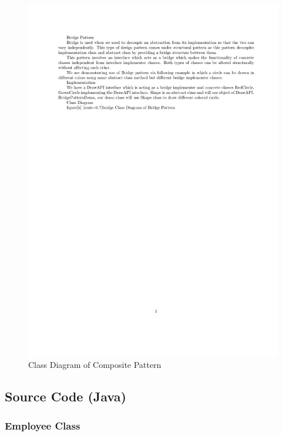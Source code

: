\begin{figure}[h]
\centering
\includegraphics[scale=0.5]{composite}
\caption{Class Diagram of Composite Pattern}
\end{figure}

\newpage
\subsection{Source Code (Java)}

\subsubsection{Employee Class}

